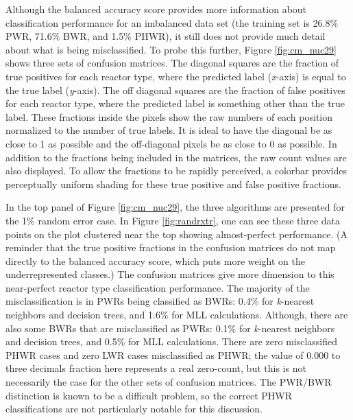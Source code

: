 Although the balanced accuracy score provides more information about
classification performance for an imbalanced data set (the training set is
26.8\% \gls{PWR}, 71.6\% \gls{BWR}, and 1.5\% \gls{PHWR}), it still does not
provide much detail about what is being misclassified. To probe this further,
Figure \ref{fig:cm_nuc29} shows three sets of confusion matrices.  The diagonal
squares are the fraction of true positives for each reactor type, where the
predicted label (\textit{x}-axis) is equal to the true label (\textit{y}-axis).
The off diagonal squares are the fraction of false positives for each reactor
type, where the predicted label is something other than the true label.  These
fractions inside the pixels show the raw numbers of each position normalized to
the number of true labels.  It is ideal to have the diagonal be as close to 1
as possible and the off-diagonal pixels be as close to 0 as possible.  In
addition to the fractions being included in the matrices, the raw count values
are also displayed. To allow the fractions to be rapidly perceived, a colorbar
provides perceptually uniform shading for these true positive and false
positive fractions. 

In the top panel of Figure \ref{fig:cm_nuc29}, the three algorithms are
presented for the 1\% random error case. In Figure \ref{fig:randrxtr}, one can
see these three data points on the plot clustered near the top showing
almost-perfect performance.  (A reminder that the true positive fractions in
the confusion matrices do not map directly to the balanced accuracy score,
which puts more weight on the underrepresented classes.) The confusion matrices
give more dimension to this near-perfect reactor type classification
performance. The majority of the misclassification is in \gls{PWR}s being
classified as \gls{BWR}s: 0.4\% for \textit{k}-nearest neighbors and decision
trees, and 1.6\% for \gls{MLL} calculations. Although, there are also some
\gls{BWR}s that are misclassified as \gls{PWR}s: 0.1\% for \textit{k}-nearest
neighbors and decision trees, and 0.5\% for \gls{MLL} calculations.  There are
zero misclassified \gls{PHWR} cases and zero \gls{LWR} cases misclassified as
\gls{PHWR}; the value of 0.000 to three decimals fraction here represents a
real zero-count, but this is not necessarily the case for the other sets of
confusion matrices.  The \gls{PWR}/\gls{BWR} distinction is known to be a
difficult problem, so the correct \gls{PHWR} classifications are not
particularly notable for this discussion. 

